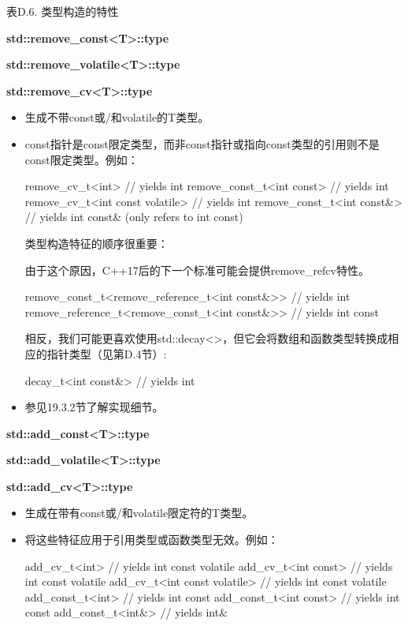 \begin{center}
表D.6. 类型构造的特性
\end{center}

\textbf{std::remove\_const<T>::type}

\textbf{std::remove\_volatile<T>::type}

\textbf{std::remove\_cv<T>::type}

\begin{itemize}
\item
生成不带const或/和volatile的T类型。

\item
const指针是const限定类型，而非const指针或指向const类型的引用则不是const限定类型。例如：

\begin{cpp}
remove_cv_t<int> // yields int
remove_const_t<int const> // yields int
remove_cv_t<int const volatile> // yields int
remove_const_t<int const&> // yields int const& (only refers to int const)
\end{cpp}

类型构造特征的顺序很重要：

\begin{notice}
由于这个原因，C++17后的下一个标准可能会提供remove\_refcv特性。
\end{notice}

\begin{cpp}
remove_const_t<remove_reference_t<int const&>> // yields int
remove_reference_t<remove_const_t<int const&>> // yields int const
\end{cpp}

相反，我们可能更喜欢使用std::decay<>，但它会将数组和函数类型转换成相应的指针类型（见第D.4节）:

\begin{cpp}
decay_t<int const&> // yields int
\end{cpp}

\item
参见19.3.2节了解实现细节。
\end{itemize}

\textbf{std::add\_const<T>::type}

\textbf{std::add\_volatile<T>::type}

\textbf{std::add\_cv<T>::type}

\begin{itemize}
\item
生成在带有const或/和volatile限定符的T类型。

\item
将这些特征应用于引用类型或函数类型无效。例如：
\begin{cpp}
add_cv_t<int> // yields int const volatile
add_cv_t<int const> // yields int const volatile
add_cv_t<int const volatile> // yields int const volatile
add_const_t<int> // yields int const
add_const_t<int const> // yields int const
add_const_t<int&> // yields int&
\end{cpp}
\end{itemize}

